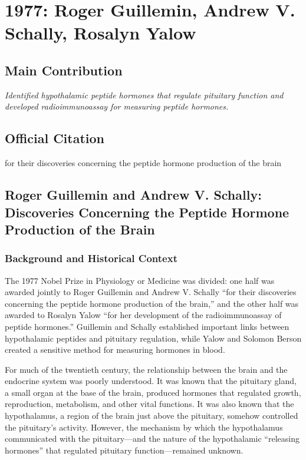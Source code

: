 \chapter[1977 --- Guillemin, Schally, and Yalow]{1977: Roger Guillemin, Andrew V. Schally, Rosalyn Yalow}
\label{ch:1977_Guillemin}

\section*{Main Contribution}

\textit{Identified hypothalamic peptide hormones that regulate pituitary function and developed radioimmunoassay for measuring peptide hormones.}\cite{nobel-1977,lecture-1977,lecture-schally-1977,lecture-yalow-1977}

\section{Official Citation}

for their discoveries concerning the peptide hormone production of the brain

\section[Roger Guillemin and Andrew V.]{Roger Guillemin and Andrew V. Schally: Discoveries Concerning the Peptide Hormone Production of the Brain}

\subsection{Background and Historical Context}

The 1977 Nobel Prize in Physiology or Medicine was divided: one half was awarded jointly to Roger Guillemin and Andrew V. Schally ``for their discoveries concerning the peptide hormone production of the brain,'' and the other half was awarded to Rosalyn Yalow ``for her development of the radioimmunoassay of peptide hormones.'' Guillemin and Schally established important links between hypothalamic peptides and pituitary regulation, while Yalow and Solomon Berson created a sensitive method for measuring hormones in blood.

For much of the twentieth century, the relationship between the brain and the endocrine system was poorly understood. It was known that the pituitary gland, a small organ at the base of the brain, produced hormones that regulated growth, reproduction, metabolism, and other vital functions. It was also known that the hypothalamus, a region of the brain just above the pituitary, somehow controlled the pituitary's activity. However, the mechanism by which the hypothalamus communicated with the pituitary---and the nature of the hypothalamic ``releasing hormones'' that regulated pituitary function---remained unknown.

